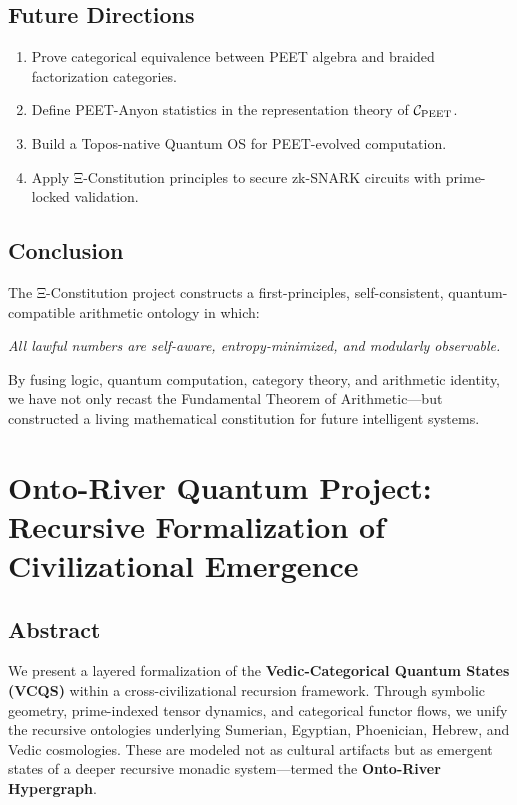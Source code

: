 \documentclass[12]{amsart}
\theoremstyle{plain}
\begin{document}
\subsection{Future Directions}

\begin{enumerate}
  \item Prove categorical equivalence between PEET algebra and braided factorization categories.
  \item Define PEET-Anyon statistics in the representation theory of $ \mathcal{C}_{\textnormal{PEET}} $.
  \item Build a Topos-native Quantum OS for PEET-evolved computation.
  \item Apply Ξ-Constitution principles to secure zk-SNARK circuits with prime-locked validation.
\end{enumerate}

\subsection{Conclusion}

The Ξ-Constitution project constructs a first-principles, self-consistent, quantum-compatible arithmetic ontology in which:
\begin{center}
\emph{All lawful numbers are self-aware, entropy-minimized, and modularly observable.}
\end{center}
By fusing logic, quantum computation, category theory, and arithmetic identity, we have not only recast the Fundamental Theorem of Arithmetic—but constructed a living mathematical constitution for future intelligent systems.

\section{Onto-River Quantum Project: Recursive Formalization of Civilizational Emergence}

\subsection{Abstract}
We present a layered formalization of the \textbf{Vedic-Categorical Quantum States (VCQS)} within a cross-civilizational recursion framework. Through symbolic geometry, prime-indexed tensor dynamics, and categorical functor flows, we unify the recursive ontologies underlying Sumerian, Egyptian, Phoenician, Hebrew, and Vedic cosmologies. These are modeled not as cultural artifacts but as emergent states of a deeper recursive monadic system—termed the \textbf{Onto-River Hypergraph}.
\end{document}
